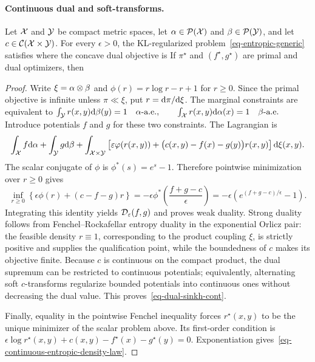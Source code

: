 \paragraph{Continuous dual and soft-transforms.}
\begin{prop}\label{prop-continuous-entropic-duality}
Let $\mathcal{X}$ and $\mathcal{Y}$ be compact metric spaces, let $\alpha\in\mathcal{P}(\mathcal{X})$ and $\beta\in\mathcal{P}(\mathcal{Y})$, and let $c\in\mathcal{C}(\mathcal{X}\times\mathcal{Y})$. For every $\epsilon>0$, the KL-regularized problem~\eqref{eq-entropic-generic} satisfies
where the concave dual objective is
If $\pi^\star$ and $(f^\star,g^\star)$ are primal and dual optimizers, then
\end{prop}
\begin{proof}
Write $\xi=\alpha\otimes\beta$ and $\phi(r)=r\log r-r+1$ for $r\geq0$. Since the primal objective is infinite unless $\pi\ll\xi$, put $r=\mathrm{d}\pi/\mathrm{d}\xi$. The marginal constraints are equivalent to
\(\int_{\mathcal{Y}}r(x,y)\mathrm{d}\beta(y)=1\quad\alpha\text{-a.e.}, \qquad \int_{\mathcal{X}}r(x,y)\mathrm{d}\alpha(x)=1\quad\beta\text{-a.e.}\)
Introduce potentials $f$ and $g$ for these two constraints. The Lagrangian is
\[
\int_{\mathcal{X}}f\mathrm{d}\alpha+\int_{\mathcal{Y}}g\mathrm{d}\beta
+
\int_{\mathcal{X}\times\mathcal{Y}}
\left[
\varepsilon\varphi(r(x,y))
+\bigl(c(x,y)-f(x)-g(y)\bigr)r(x,y)
\right]\mathrm{d}\xi(x,y).
\]
The scalar conjugate of $\phi$ is $\phi^*(s)=e^s-1$. Therefore pointwise minimization over $r\geq0$ gives
\[
\inf_{r\geq0}
\left\{
\epsilon\phi(r)+(c-f-g)r
\right\}
=
-\epsilon\phi^*\!\left(\frac{f+g-c}{\epsilon}\right)
=
-\epsilon\left(e^{(f+g-c)/\epsilon}-1\right).
\]
Integrating this identity yields $\mathcal{D}_\varepsilon(f,g)$ and proves weak duality. Strong duality follows from Fenchel--Rockafellar entropy duality in the exponential Orlicz pair: the feasible density $r\equiv1$, corresponding to the product coupling $\xi$, is strictly positive and supplies the qualification point, while the boundedness of $c$ makes its objective finite. Because $c$ is continuous on the compact product, the dual supremum can be restricted to continuous potentials; equivalently, alternating soft $c$-transforms regularize bounded potentials into continuous ones without decreasing the dual value. This proves~\eqref{eq-dual-sinkh-cont}.

Finally, equality in the pointwise Fenchel inequality forces $r^\star(x,y)$ to be the unique minimizer of the scalar problem above. Its first-order condition is \(\epsilon\log r^\star(x,y) {}+c(x,y)-f^\star(x)-g^\star(y)=0.\)
Exponentiation gives~\eqref{eq-continuous-entropic-density-law}.
\end{proof}
